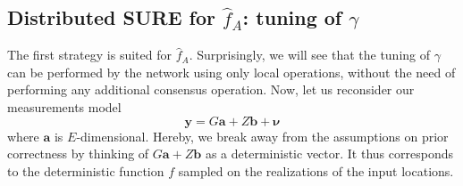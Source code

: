 \documentclass[10pt,twocolumn,twoside]{IEEEtran}					%
\theoremstyle	{plain}
\newcommand{\TraceOf}				[1]	{\mathrm{tr} \left( #1 \right)}
\begin{document}
\subsection{Distributed \ac{SURE} for $\widehat{f}_{A}$: tuning of $\gamma$}
\label{ssec:distributed_sure_for_widehat_f_a}

The first strategy is suited for $\widehat{f}_{A}$. Surprisingly, we will see that the tuning of $\gamma$ can be performed by the network using only local operations, without the need of performing any additional consensus operation. Now, let us reconsider our measurements model 
$$
\bm{y} = G \bm{a} + Z \bm{b} + \bm{\nu}
$$
where $\bm{a}$ is $E$-dimensional. Hereby, we break away from the assumptions on prior correctness by thinking of $G \bm{a} + Z \bm{b}$ as a deterministic vector. It thus corresponds to the deterministic function $f$ sampled on the realizations of the input locations.

\end{document}
